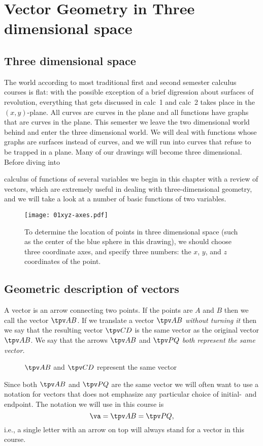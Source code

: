 
\chapter{Vector Geometry in Three dimensional space} %

\section{Three dimensional space} %
The world according to most traditional first and second semester calculus
courses is flat:
with the possible exception of a brief digression about surfaces of revolution,
everything that gets discussed in calc~1 and calc~2 takes place in the
$(x,y)$-plane.  All curves are curves in the plane and all functions have graphs
that are curves in the plane.  This semester we leave the two dimensional world
behind and enter the three dimensional world.  We will deal with functions whose
graphs are surfaces instead of curves, and we will run into curves that refuse
to be trapped in a plane.  Many of our drawings will become three dimensional.
Before diving into

calculus of functions of several variables we begin in this chapter
with a review of vectors, which are extremely useful in dealing with
three-dimensional geometry, and we will take a look at a number of
basic functions of two variables.
\begin{figure}[h]
  \centering
  \texttt{[image: 01xyz-axes.pdf]}
  \caption{To determine the location of points in three dimensional
    space (such as the center of the blue sphere in this drawing), we
    should choose three coordinate axes, and specify three numbers:
    the $x$, $y$, and $z$ coordinates of the point.  }
\end{figure}




\section{Geometric description of vectors} %
\label{sec:geometric-description-of-vectors}
A vector is an arrow connecting two points.  If the points are $A$ and
$B$ then we call the vector $\tpv AB$. If we translate a vector $\tpv
AB$ \emph{without turning it} then we say that the resulting vector
$\tpv CD$ is the same vector as the original vector $\tpv AB$.  We say
that the arrows $\tpv AB$ and $\tpv PQ$ \emph{both represent the same
  vector.}
\begin{figure}[h]\centering
  
  \caption{$\tpv AB$ and $\tpv CD$ represent the same vector}
\end{figure}
Since both $\tpv AB$ and $\tpv PQ$ are the same vector we will often
want to use a notation for vectors that does not emphasize any
particular choice of initial-~and endpoint.  The notation we will use
in this course is
\[
\va = \tpv AB = \tpv PQ,
\]
i.e., a single letter with an arrow on top will always stand for a
vector in this course.

